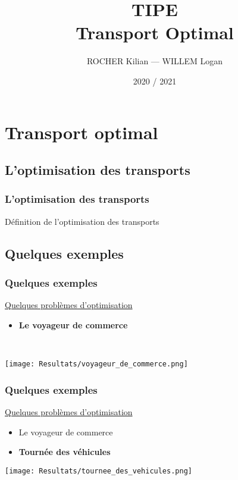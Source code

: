 \documentclass[10pt]{beamer}
\title[TIPE — Transport Optimal]{TIPE \\ Transport Optimal}
\author{ROCHER Kilian — WILLEM Logan}
\date{2020 / 2021}
\begin{document}
	\begin{frame}[plain]
		\maketitle
	\end{frame}

	\begin{frame}[plain]
		\tableofcontents
	\end{frame}

	\section{Transport optimal}
	
	\subsection{L'optimisation des transports}
	
	\begin{frame}
		\frametitle{L'optimisation des transports}
		Définition de l'optimisation des transports
	\end{frame}
	
	\subsection{Quelques exemples}
	
	\begin{frame}
		\frametitle{Quelques exemples}
		\underline{Quelques problèmes d'optimisation}
		\pause
		\begin{itemize}[label=—]
			\item \textbf{Le voyageur de commerce}
		\end{itemize}
		\ \\
		\begin{center}
			\texttt{[image: Resultats/voyageur\_de\_commerce.png]}
		\end{center}
	\end{frame}

	\begin{frame}
		\frametitle{Quelques exemples}
		\underline{Quelques problèmes d'optimisation}
		\begin{itemize}[label=—]
			\item Le voyageur de commerce
			\item \textbf{Tournée des véhicules}
		\end{itemize}
		\begin{center}
			\texttt{[image: Resultats/tournee\_des\_vehicules.png]}
		\end{center}
	\end{frame}
\end{document}
